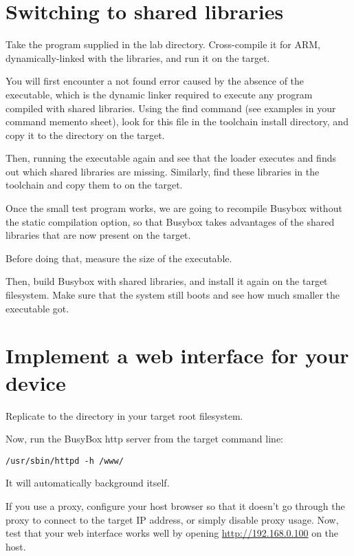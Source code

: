 \section{Switching to shared libraries}

Take the  program supplied in the lab 
directory. Cross-compile it for ARM, dynamically-linked with the
libraries, and run it on the target.

You will first encounter a not found error caused by the absence of
the  executable, which is the dynamic linker
required to execute any program compiled with shared libraries. Using
the find command (see examples in your command memento sheet), look
for this file in the toolchain install directory, and copy it to the
 directory on the target.

Then, running the executable again and see that the loader executes
and finds out which shared libraries are missing. Similarly, find
these libraries in the toolchain and copy them to  on the
target.

Once the small test program works, we are going to recompile Busybox
without the static compilation option, so that Busybox takes advantages of the
shared libraries that are now present on the target.

Before doing that, measure the size of the  executable.

Then, build Busybox with shared libraries, and install it again on the
target filesystem. Make sure that the system still boots and see
how much smaller the  executable got.


\section{Implement a web interface for your device}

Replicate  to the  directory in your target root filesystem.

Now, run the BusyBox http server from the target command line:

\begin{verbatim}
/usr/sbin/httpd -h /www/
\end{verbatim}

It will automatically background itself.

If you use a proxy, configure your host browser so that it doesn't go
through the proxy to connect to the target IP address, or simply
disable proxy usage.  Now, test that your web interface works well by
opening \url{http://192.168.0.100} on the host.

